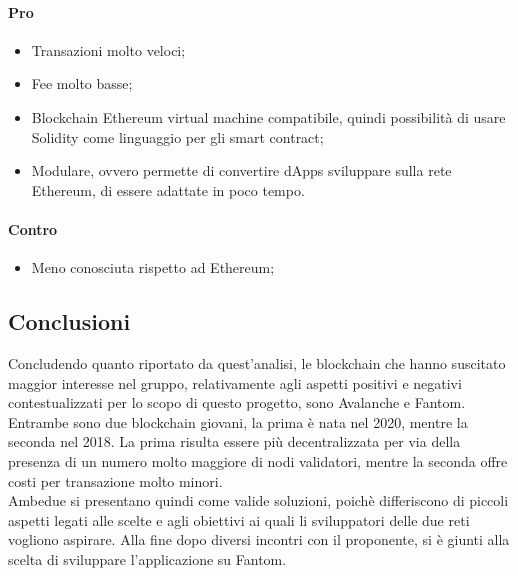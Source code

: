     \paragraph{Pro}
    \begin{itemize}
        \item Transazioni molto veloci;
        \item Fee molto basse;
        \item Blockchain Ethereum virtual machine compatibile, quindi possibilità di usare Solidity come linguaggio per gli smart contract;
        \item Modulare, ovvero permette di convertire dApps sviluppare sulla rete Ethereum, di essere adattate in poco tempo.
    \end{itemize}
    \paragraph{Contro}
    \begin{itemize}
        \item Meno conosciuta rispetto ad Ethereum;
    \end{itemize}

\subsection{Conclusioni}
Concludendo quanto riportato da quest'analisi, le blockchain che hanno suscitato maggior interesse nel gruppo, relativamente agli aspetti positivi e negativi contestualizzati per lo scopo di questo progetto,
sono Avalanche e Fantom. Entrambe sono due blockchain giovani, la prima è nata nel 2020, mentre la seconda nel 2018. La prima risulta essere più decentralizzata per via della presenza di un numero molto maggiore di nodi validatori, mentre la seconda
offre costi per transazione molto minori.\\
Ambedue si presentano quindi come valide soluzioni, poichè differiscono di piccoli aspetti legati alle scelte e agli obiettivi ai quali li sviluppatori delle due reti vogliono aspirare. Alla fine dopo diversi incontri con il proponente, si è giunti
alla scelta di sviluppare l'applicazione su Fantom.